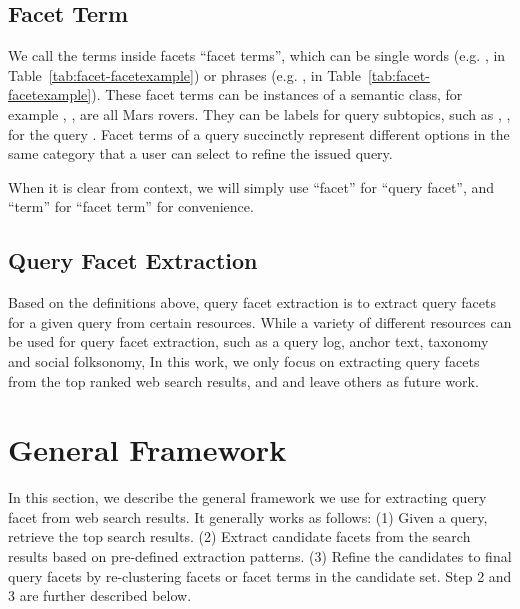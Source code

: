 \subsection{Facet Term}
We call the terms inside facets ``facet terms'', which can be single words (e.g. ,  in Table~\ref{tab:facet-facetexample}) or phrases (e.g. ,  in Table~\ref{tab:facet-facetexample}). 
These facet terms can be instances of a semantic class, for example , ,  are all Mars rovers. They can be labels for query subtopics, such as , ,  for the query . Facet terms of a query succinctly represent different options in the same category that a user can select to refine the issued query. 

When it is clear from context, we will simply use ``facet'' for ``query facet'', and ``term'' for ``facet term'' for convenience.

\subsection{Query Facet Extraction}
Based on the definitions above, query facet extraction is to extract query facets for a given query from certain resources. While a variety of different resources can be used for query facet extraction, such as a query log, anchor text, taxonomy and social folksonomy, In this work, we only focus on extracting query facets from the top ranked web search results, and and leave others as future work.

\section{General Framework}
\label{sec:facet-framework}
In this section, we describe the general framework we use for extracting query facet from web search results. It generally works as follows: (1) Given a query, retrieve the top search results. (2) Extract candidate facets from the search results based on pre-defined extraction patterns. (3) Refine the candidates to final query facets by re-clustering facets or facet terms in the candidate set. Step 2 and 3 are further described below.

